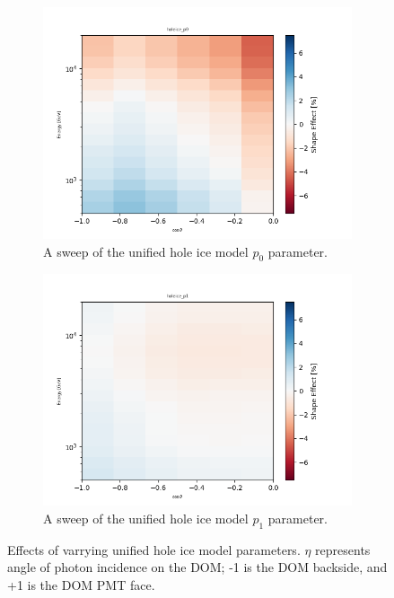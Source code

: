 \documentclass[main.tex]{subfiles}
\begin{document}
\begin{figure}
    \centering
    \begin{subfigure}{.45\textwidth}
        \centering
        \includegraphics[width=0.95\linewidth]{./figures/holeice_p0.png}
        \caption{A sweep of the unified hole ice model $p_0$ parameter.}
    \end{subfigure}%
    \begin{subfigure}{.45\textwidth}
        \centering
        \includegraphics[width=0.95\linewidth]{./figures/holeice_p1.png}
        \caption{A sweep of the unified hole ice model $p_1$ parameter.}
    \end{subfigure}
    \caption{Effects of varrying unified hole ice model parameters. $\eta$ represents angle of photon incidence on the DOM; -1 is the DOM backside, and +1 is the DOM PMT face.}\label{fig:holeiceog}
\end{figure}
\end{document}
